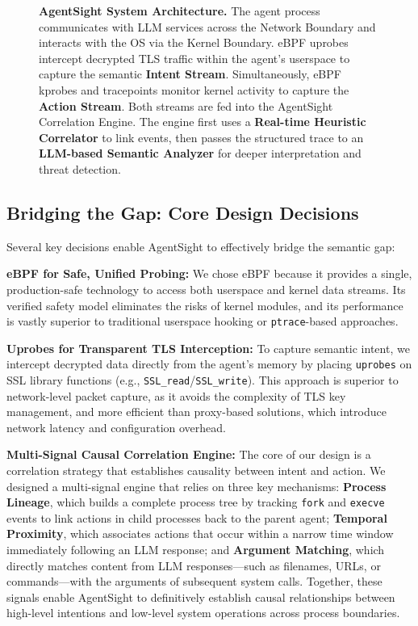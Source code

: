 \begin{figure}[h!]
    \centering
    \caption{\textbf{AgentSight System Architecture.} The agent process communicates with LLM services across the Network Boundary and interacts with the OS via the Kernel Boundary. eBPF uprobes intercept decrypted TLS traffic within the agent's userspace to capture the semantic \textbf{Intent Stream}. Simultaneously, eBPF kprobes and tracepoints monitor kernel activity to capture the \textbf{Action Stream}. Both streams are fed into the AgentSight Correlation Engine. The engine first uses a \textbf{Real-time Heuristic Correlator} to link events, then passes the structured trace to an \textbf{LLM-based Semantic Analyzer} for deeper interpretation and threat detection.}
    \label{fig:architecture}
\end{figure}

\subsection{Bridging the Gap: Core Design Decisions}
Several key decisions enable AgentSight to effectively bridge the semantic gap:

\textbf{eBPF for Safe, Unified Probing:} We chose eBPF because it provides a single, production-safe technology to access both userspace and kernel data streams. Its verified safety model eliminates the risks of kernel modules, and its performance is vastly superior to traditional userspace hooking or \texttt{ptrace}-based approaches.

\textbf{Uprobes for Transparent TLS Interception:} To capture semantic intent, we intercept decrypted data directly from the agent's memory by placing \texttt{uprobes} on SSL library functions (e.g., \texttt{SSL\_read}/\texttt{SSL\_write}). This approach is superior to network-level packet capture, as it avoids the complexity of TLS key management, and more efficient than proxy-based solutions, which introduce network latency and configuration overhead.

\textbf{Multi-Signal Causal Correlation Engine:} The core of our design is a correlation strategy that establishes causality between intent and action. We designed a multi-signal engine that relies on three key mechanisms: \textbf{Process Lineage}, which builds a complete process tree by tracking \texttt{fork} and \texttt{execve} events to link actions in child processes back to the parent agent; \textbf{Temporal Proximity}, which associates actions that occur within a narrow time window immediately following an LLM response; and \textbf{Argument Matching}, which directly matches content from LLM responses—such as filenames, URLs, or commands—with the arguments of subsequent system calls. Together, these signals enable AgentSight to definitively establish causal relationships between high-level intentions and low-level system operations across process boundaries.

